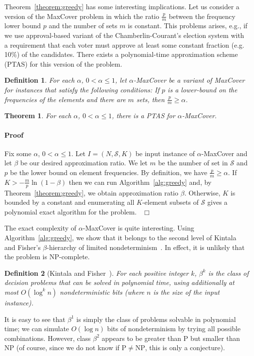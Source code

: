 \documentclass[11pt]{article}
\newtheorem{theorem}{Theorem}
\newtheorem{definition}{Definition}
\newenvironment{proof}{\paragraph{Proof}}{\hfill$\Box$\medskip}
\newcommand{\np}{{\mathrm{NP}}}
\newcommand{\p}{{\mathrm{P}}}
\newcommand{\calS}{{{\mathcal{S}}}}
\begin{document}
Theorem~\ref{theorem:greedy} has some interesting implications. Let us
consider a version of the MaxCover problem in which the ratio
$\frac{p}{m}$ between the frequency lower bound $p$ and the number of
sets $m$ is constant.  This problems arises, e.g., if we use
approval-based variant of the Chamberlin-Courant's election system
with a requirement that each voter must approve at least some constant
fraction (e.g. 10\%) of the candidates. There exists a polynomial-time
approximation scheme (PTAS) for this version of the problem.

\begin{definition}
  For each $\alpha$, $0 < \alpha \leq 1$,  let
  $\alpha$-MaxCover be a variant of MaxCover for instances that
  satisfy the following conditions: If $p$ is a lower-bound on the
  frequencies of the elements and there are $m$ sets, then
  $\frac{p}{m} \geq \alpha$.
\end{definition}

\begin{theorem}\label{thm:ptas}
  For each $\alpha$, $0 < \alpha \leq 1$, there is a PTAS for
  $\alpha$-MaxCover.
\end{theorem}
\begin{proof}
  Fix some $\alpha$, $0 < \alpha \leq 1$.  Let $I = (N,\calS,K)$ be
  input instance of $\alpha$-MaxCover and let $\beta$ be our desired
  approximation ratio.  We let $m$ be the number of set in $\calS$ and
  $p$ be the lower bound on element frequencies. By definition, we
  have $\frac{p}{m} \geq \alpha$.  If $K > -\frac{m}{p}\ln(1 - \beta)$
  then we can run Algorithm~\ref{alg:greedy} and, by
  Theorem~\ref{theorem:greedy}, we obtain approximation ratio
  $\beta$. Otherwise, $K$ is bounded by a constant and enumerating all
  $K$-element subsets of $\calS$ gives a polynomial exact algorithm
  for the problem.~
\end{proof}


The exact complexity of $\alpha$-MaxCover is quite interesting.  Using
Algorithm~\ref{alg:greedy}, we show that it belongs to the second
level of Kintala and Fisher's $\beta$-hierarchy of limited
nondeterminism~\cite{fis-kin:j:beta}. In effect, it is unlikely that
the problem is $\np$-complete.

\begin{definition}[Kintala and Fisher~\cite{fis-kin:j:beta}]
  For each positive integer $k$, $\beta^k$ is the class of decision
  problems that can be solved in polynomial time, using additionally
  at most $O(\log^kn)$ nondeterministic bits (where $n$ is the size of
  the input instance).
\end{definition}
It is easy to see that $\beta^1$ is simply the class of problems
solvable in polynomial time; we can simulate $O(\log n)$ bits of
nondeterminism by trying all possible combinations. However, class
$\beta^2$ appears to be greater than $\p$ but smaller than $\np$ (of
course, since we do not know if $\p \neq \np$, this is only a
conjecture).
\end{document}
